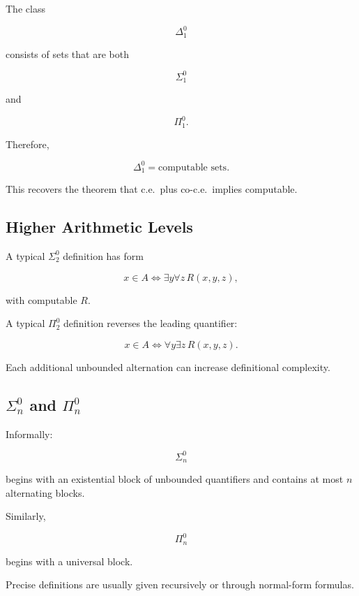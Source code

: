 The class

\[
\Delta^0_1
\]

consists of sets that are both

\[
\Sigma^0_1
\]

and

\[
\Pi^0_1.
\]

Therefore,

\[
\boxed{
\Delta^0_1
=
\text{computable sets}.
}
\]

This recovers the theorem that c.e.\ plus co-c.e.\ implies computable.

\subsection{Higher Arithmetic Levels}
\label{subsec:higher-arithmetic-levels}

A typical \(\Sigma^0_2\) definition has form

\[
\boxed{
x\in A
\iff
\exists y
\forall z
\,
R(x,y,z),
}
\]

with computable \(R\).

A typical \(\Pi^0_2\) definition reverses the leading quantifier:

\[
\boxed{
x\in A
\iff
\forall y
\exists z
\,
R(x,y,z).
}
\]

Each additional unbounded alternation can increase definitional complexity.

\subsection{\(\Sigma^0_n\) and \(\Pi^0_n\)}
\label{subsec:sigma-pi-n}

Informally:

\[
\boxed{
\Sigma^0_n
}
\]

begins with an existential block of unbounded quantifiers and contains at
most \(n\) alternating blocks.

Similarly,

\[
\boxed{
\Pi^0_n
}
\]

begins with a universal block.

Precise definitions are usually given recursively or through normal-form
formulas.


